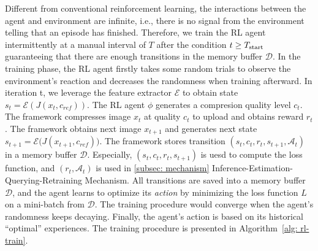 Different from conventional reinforcement learning, the interactions between the agent and environment are infinite, i.e., there is no signal from the environment telling that an episode has finished. Therefore, we train the RL agent intermittently at a manual interval of $ T $ after the condition $ t \geq T_{\rm start} $ guaranteeing that there are enough transitions in the memory buffer $ \mathcal{D} $. In the training phase, the RL agent firstly takes some random trials to observe the environment's reaction and decreases the randomness when training afterward. {\color{revise2} In iteration t, we  leverage the feature extractor $\mathcal{E}$ to obtain state $s_t = \mathcal{E}(J(x_t,c_{ref}))$. The RL agent $\phi$ generates a compresion quality level $c_t$. The framework compresses image $x_t$ at quality $c_t$ to upload and obtains reward $r_t$. The framework obtains next image $x_{t+1}$ and generates next state $ s_{t+1} = \mathcal{E}\big(J(x_{t+1},c_{ref})\big) $. The framework stores transition $(s_t, c_t, r_t, s_{t+1},\mathcal{A}_t )$ in a memory buffer $\mathcal{D}$. Especially, $(s_t, c_t, r_t, s_{t+1} )$ is uesd to compute the loss function, and $(r_t,\mathcal{A}_t )$ is used in \ref{subsec: mechanism}  Inference-Estimation-Querying-Retraining Mechanism.} All transitions are saved into a memory buffer $ \mathcal{D} $, and the agent learns to optimize its \emph{action} by minimizing the loss function $ L $ on a mini-batch from $ \mathcal{D} $. The training procedure would converge when the agent's randomness keeps decaying. Finally, the agent's action is based on its historical ``optimal'' experiences. The training procedure is presented in Algorithm~\ref{alg: rl-train}.


